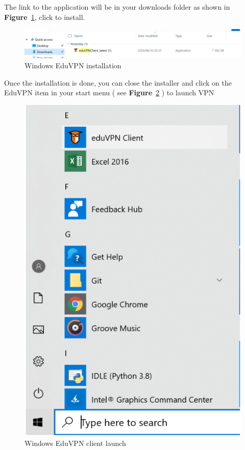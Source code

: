 The link to the application will be in your downloads folder as shown in \textbf{Figure}~\ref{fig:image8}, click to install.
\begin{figure}[!thb]
	\centering
	\includegraphics[scale=0.23]{Chapters/images/image8.png}
	
	\caption{Windows EduVPN installation}
	\label{fig:image8}
\end{figure}
Once the installation is done, you can close the installer and click on the EduVPN item in your start menu ( see \textbf{Figure}~\ref{fig:image28} ) to launch VPN
\begin{figure}[H]
	\centering
	\includegraphics[scale=0.5]{Chapters/images/image28.png}
	
	\caption{Windows EduVPN client launch }
	\label{fig:image28}
\end{figure}

